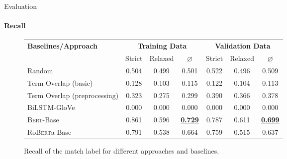 \documentclass[english,handout]{mlutalk}
\newcommand{\BiLSTM}{\mbox{BiLSTM}\xspace}
\newcommand{\Bert}{\textsc{Bert}\xspace}
\newcommand{\BertBase}{\Bert-Base\xspace}
\newcommand{\Roberta}{\mbox{Ro\textsc{Bert}a}\xspace}
\newcommand{\RobertaBase}{\Roberta-Base\xspace}
\renewcommand{\lg}{\color{lightgray}}
\begin{document}
\begin{frame}{Evaluation}
  \framesubtitle{Recall}
  \begin{figure}
    \centering
    \caption{Recall of the match label for different approaches and baselines.}
    \scriptsize
    \begin{tabular}{lcccccc}
      \toprule
      \textbf{Baselines/Approach} & \multicolumn{3}{c}{\textbf{Training Data}} & \multicolumn{3}{c}{\textbf{Validation Data}} \\
      \cmidrule(r{0.5em}){2-4} \cmidrule(l{0.5em}){5-7}
      & Strict & Relaxed & \(\varnothing\) & Strict & Relaxed & \(\varnothing\) \\
      \midrule
      Random 
      & 0.504 & 0.499 & 0.501 & 0.522 & 0.496 & 0.509 \\
      Term Overlap (basic)
      & 0.128 & 0.103 & 0.115 & 0.122 & 0.104 & 0.113 \\
      Term Overlap (preprocessing)
      & 0.323 & 0.275 & 0.299 & 0.390 & 0.366 & 0.378 \\
      \midrule
      \lg\BiLSTM-GloVe
      & \lg0.000 & \lg0.000 & \lg0.000 & \lg0.000 & \lg0.000 & \lg0.000 \\
      \BertBase
      & 0.861 & 0.596 & \textbf{\underline{0.729}} & 0.787 & 0.611 & \textbf{\underline{0.699}} \\
      \RobertaBase
      & 0.791 & 0.538 & 0.664 & 0.759 & 0.515 & 0.637 \\
      \bottomrule
    \end{tabular}
  \end{figure}
\end{frame}
\end{document}
